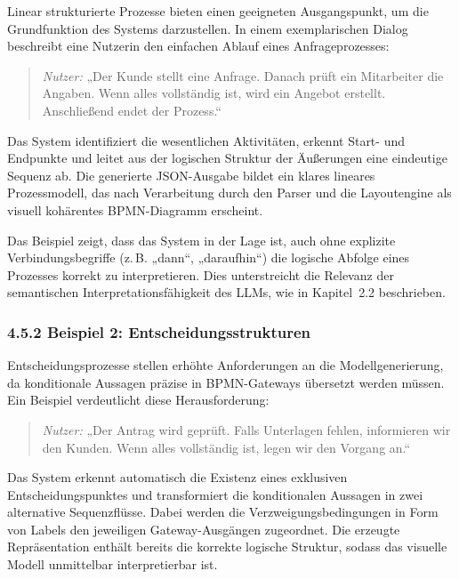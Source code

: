 \documentclass[a4paper,12pt]{scrreprt}
\begin{document}
Linear strukturierte Prozesse bieten einen geeigneten Ausgangspunkt, um die Grundfunktion des Systems darzustellen. In einem exemplarischen Dialog beschreibt eine Nutzerin den einfachen Ablauf eines Anfrageprozesses:

\begin{quote}
	\textit{Nutzer:} „Der Kunde stellt eine Anfrage. Danach prüft ein Mitarbeiter die Angaben. 
	Wenn alles vollständig ist, wird ein Angebot erstellt. Anschließend endet der Prozess.“ \\
\end{quote}

Das System identifiziert die wesentlichen Aktivitäten, erkennt Start- und Endpunkte und leitet aus der logischen Struktur der Äußerungen eine eindeutige Sequenz ab. Die generierte JSON-Ausgabe bildet ein klares lineares Prozessmodell, das nach Verarbeitung durch den Parser und die Layoutengine als visuell kohärentes BPMN-Diagramm erscheint.

Das Beispiel zeigt, dass das System in der Lage ist, auch ohne explizite Verbindungsbegriffe (z.\,B. „dann“, „daraufhin“) die logische Abfolge eines Prozesses korrekt zu interpretieren. Dies unterstreicht die Relevanz der semantischen Interpretationsfähigkeit des LLMs, wie in Kapitel~2.2 beschrieben.

\subsubsection*{4.5.2 Beispiel 2: Entscheidungsstrukturen}

Entscheidungsprozesse stellen erhöhte Anforderungen an die Modellgenerierung, da konditionale Aussagen präzise in BPMN-Gateways übersetzt werden müssen. Ein Beispiel verdeutlicht diese Herausforderung:

\begin{quote}
	\textit{Nutzer:} „Der Antrag wird geprüft. Falls Unterlagen fehlen, informieren wir den 
	Kunden. Wenn alles vollständig ist, legen wir den Vorgang an.“ \\
\end{quote}

Das System erkennt automatisch die Existenz eines exklusiven Entscheidungspunktes und transformiert die konditionalen Aussagen in zwei alternative Sequenzflüsse. Dabei werden die Verzweigungsbedingungen in Form von Labels den jeweiligen Gateway-Ausgängen zugeordnet. Die erzeugte Repräsentation enthält bereits die korrekte logische Struktur, sodass das visuelle Modell unmittelbar interpretierbar ist.
\end{document}
